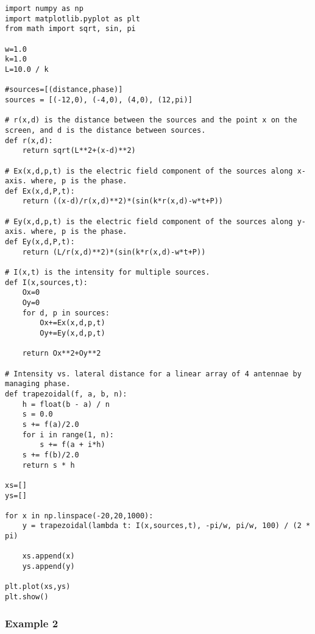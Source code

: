 \begin{Verbatim}[fontsize=\small,baselinestretch=0.9]
import numpy as np
import matplotlib.pyplot as plt
from math import sqrt, sin, pi

w=1.0
k=1.0
L=10.0 / k

#sources=[(distance,phase)]
sources = [(-12,0), (-4,0), (4,0), (12,pi)]

# r(x,d) is the distance between the sources and the point x on the screen, and d is the distance between sources.
def r(x,d):
    return sqrt(L**2+(x-d)**2)
    
# Ex(x,d,p,t) is the electric field component of the sources along x-axis. where, p is the phase.
def Ex(x,d,P,t):
    return ((x-d)/r(x,d)**2)*(sin(k*r(x,d)-w*t+P))

# Ey(x,d,p,t) is the electric field component of the sources along y-axis. where, p is the phase.
def Ey(x,d,P,t):
    return (L/r(x,d)**2)*(sin(k*r(x,d)-w*t+P))
       
# I(x,t) is the intensity for multiple sources.
def I(x,sources,t):
    Ox=0
    Oy=0
    for d, p in sources:
        Ox+=Ex(x,d,p,t)
        Oy+=Ey(x,d,p,t)
    
    return Ox**2+Oy**2
        
# Intensity vs. lateral distance for a linear array of 4 antennae by managing phase.
def trapezoidal(f, a, b, n):
    h = float(b - a) / n
    s = 0.0
    s += f(a)/2.0
    for i in range(1, n):
        s += f(a + i*h)
    s += f(b)/2.0
    return s * h

xs=[]
ys=[]

for x in np.linspace(-20,20,1000):
    y = trapezoidal(lambda t: I(x,sources,t), -pi/w, pi/w, 100) / (2 * pi)
   
    xs.append(x)
    ys.append(y)

plt.plot(xs,ys)
plt.show()   
\end{Verbatim}


\subsubsection{Example 2}\label{code:phase_left}

